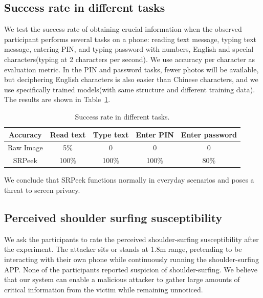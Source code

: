 \subsection{Success rate in different tasks}
We test the success rate of obtaining crucial information when the observed participant performs several tasks on a phone: reading text message, typing text message, entering PIN, and typing password with numbers, English and special characters(typing at 2 characters per second). We use accuracy per character as evaluation metric. In the PIN and password tasks, fewer photos will be available, but deciphering English characters is also easier than Chinese characters, and we use specifically trained models(with same structure and different training data). The results are shown in Table~\ref{table-task}.

\begin{table}[!t]
\centering
\caption{Success rate in different tasks.}
\label{table-task}
\begin{tabular}{@{}ccccc@{}}
	\toprule
Accuracy & Read text & Type text & Enter PIN & Enter password\\ \midrule
Raw Image & 5\% & 0 & 0 & 0\\
SRPeek & 100\% & 100\% & 100\% & 80\%\\ \bottomrule
\end{tabular}

\end{table}

We conclude that \textsf{SRPeek} functions normally in everyday scenarios and poses a threat to screen privacy.

\subsection{Perceived shoulder surfing susceptibility}
We ask the participants to rate the perceived shoulder-surfing susceptibility after the experiment. The attacker sits or stands at 1.8m range, pretending to be interacting with their own phone while continuously running the shoulder-surfing APP. None of the participants reported suspicion of shoulder-surfing. We believe that our system can enable a malicious attacker to gather large amounts of critical information from the victim while remaining unnoticed.




